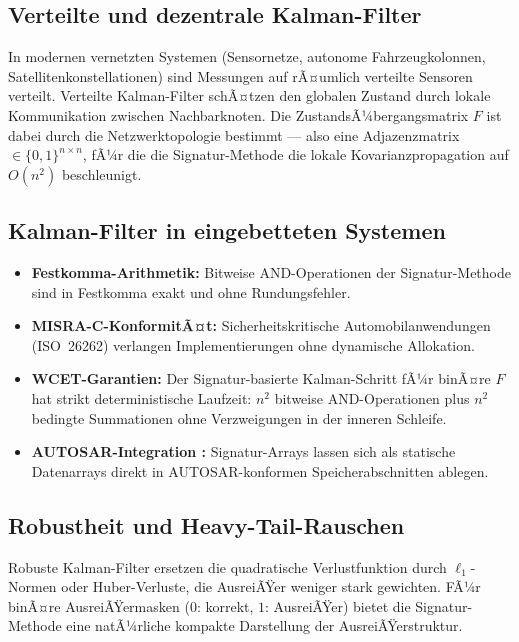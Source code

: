 ﻿\documentclass[a4paper,12pt]{article}
\theoremstyle{definition}
\begin{document}
\subsection{Verteilte und dezentrale Kalman-Filter}

In modernen vernetzten Systemen (Sensornetze, autonome Fahrzeugkolonnen,
Satellitenkonstellationen) sind Messungen auf rÃ¤umlich verteilte Sensoren verteilt.
Verteilte Kalman-Filter \cite{olfati2007} schÃ¤tzen den globalen Zustand durch lokale
Kommunikation zwischen Nachbarknoten. Die ZustandsÃ¼bergangsmatrix $F$ ist dabei durch
die Netzwerktopologie bestimmt --- also eine Adjazenzmatrix $\in \{0,1\}^{n\times n}$,
fÃ¼r die die Signatur-Methode die lokale Kovarianzpropagation auf $O(n^2)$ beschleunigt.

\subsection{Kalman-Filter in eingebetteten Systemen}

\begin{itemize}
    \item \textbf{Festkomma-Arithmetik:} Bitweise AND-Operationen der Signatur-Methode
          sind in Festkomma exakt und ohne Rundungsfehler.
    \item \textbf{MISRA-C-KonformitÃ¤t:} Sicherheitskritische Automobilanwendungen
          (ISO~26262) verlangen Implementierungen ohne dynamische Allokation.
    \item \textbf{WCET-Garantien:} Der Signatur-basierte Kalman-Schritt fÃ¼r
          binÃ¤re $F$ hat strikt deterministische Laufzeit: $n^2$ bitweise AND-Operationen
          plus $n^2$ bedingte Summationen ohne Verzweigungen in der inneren Schleife.
    \item \textbf{AUTOSAR-Integration \cite{autosar}:} Signatur-Arrays lassen sich als
          statische Datenarrays direkt in AUTOSAR-konformen Speicherabschnitten ablegen.
\end{itemize}

\subsection{Robustheit und Heavy-Tail-Rauschen}

Robuste Kalman-Filter \cite{gandhi2010} ersetzen die quadratische Verlustfunktion
durch $\ell_1$-Normen oder Huber-Verluste, die AusreiÃŸer weniger stark gewichten.
FÃ¼r binÃ¤re AusreiÃŸermasken ($0$: korrekt, $1$: AusreiÃŸer) bietet die Signatur-Methode
eine natÃ¼rliche kompakte Darstellung der AusreiÃŸerstruktur.
\end{document}
